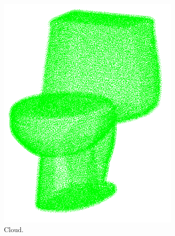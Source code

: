 \begin{figure}[!t]
\begin{subfigure}{0.32\linewidth}
    \includegraphics[width=\linewidth]{Figures/ObjRecog/toilet_cloud.png}
    \caption{Cloud.}
    \label{fig:objrecog:dataproc:cloud}
  \end{subfigure}
  \begin{subfigure}{0.32\linewidth}

\end{subfigure}
\end{figure}
